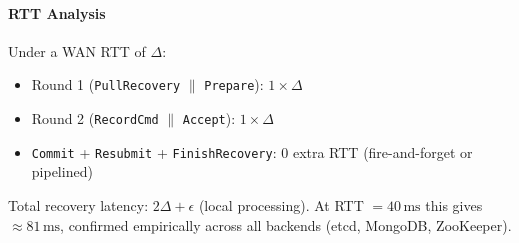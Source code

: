 \documentclass[twocolumn]{article}
\begin{document}
\paragraph{RTT Analysis}
Under a WAN RTT of $\Delta$:
\begin{itemize}
  \setlength{\itemsep}{0pt}
  \item Round 1 (\texttt{PullRecovery} $\|$ \texttt{Prepare}): $1 \times \Delta$
  \item Round 2 (\texttt{RecordCmd} $\|$ \texttt{Accept}): $1 \times \Delta$
  \item \texttt{Commit} + \texttt{Resubmit} + \texttt{FinishRecovery}: 0 extra RTT (fire-and-forget or pipelined)
\end{itemize}
Total recovery latency: $2\Delta + \epsilon$ (local processing). At RTT $= 40\,\text{ms}$ this gives $\approx 81\,\text{ms}$, confirmed empirically across all backends (etcd, MongoDB, ZooKeeper).
\end{document}
